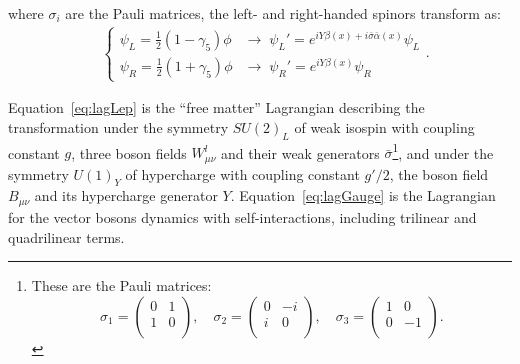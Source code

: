 where $\sigma_{i}$ are the Pauli matrices, the left- and right-handed spinors transform as:
\begin{align}
&\left \{ \begin{array}{ll}
\psi_{L} = \frac{1}{2}(1 - \gamma_{5})\phi &\rightarrow \; \psi_{L}' = e^{iY\beta(x) + i\bar{\sigma}\bar{\alpha}(x)}\psi_{L} \\
\psi_{R} = \frac{1}{2}(1 + \gamma_{5})\phi &\rightarrow \; \psi_{R}' = e^{iY\beta(x)}\psi_{R}
\end{array} \right. .
\label{eq:chiral}
\end{align}

Equation~\ref{eq:lagLep} is the ``free matter'' Lagrangian 
describing the transformation under the symmetry $SU(2)_{L}$ of weak isospin
with coupling constant $g$, three boson fields $W^{l}_{\mu\nu}$ and
their weak generators $\bar{\sigma}$\footnote{These are the Pauli matrices: 
$$
\sigma_{1} = \left(\begin{array}{cc} 0 & 1 \\ 1 & 0 \\ \end{array}\right), \quad
\sigma_{2} = \left(\begin{array}{cc} 0 & -i \\ i & 0 \\ \end{array}\right), \quad
\sigma_{3} = \left(\begin{array}{cc} 1 & 0 \\ 0 & -1 \\ \end{array}\right).
$$}, and under the symmetry
$U(1)_{Y}$ of hypercharge with coupling constant $g'/2$,
the boson field $B_{\mu\nu}$ and its hypercharge generator $Y$.
Equation~\ref{eq:lagGauge} is the Lagrangian for the vector bosons 
dynamics with self-interactions, including trilinear and quadrilinear terms. 



